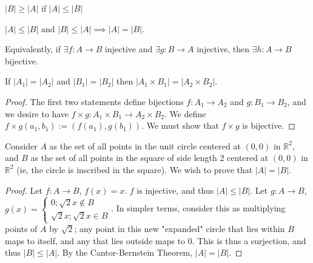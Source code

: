 \documentclass[12pt,oneside]{article}
\begin{document}
\begin{proposition}
  $|B|\geq |A|$ if $|A|\leq |B|$
\end{proposition}

\begin{theorem}
  $|A| \leq |B| \text{ and } |B| \leq |A| \implies |A| = |B|$.
  \footnotemark

  Equivalently, if $\exists f: A \to B$ injective and $\exists g: B \to A$ injective, then $\exists h: A \to B$ bijective.
\end{theorem}

\begin{proposition}
  If $|A_1|=|A_2|$ and $|B_1|=|B_2|$ then $|A_1 \times B_1| = |A_2 \times B_2|$.
\end{proposition}
\begin{proof}[Proof]
  The first two statements define bijections $f: A_1 \to A_2$ and $g: B_1 \to B_2$, and we desire to have $f \times g:  A_1 \times B_1 \to A_2 \times B_2$. We define $f\times g(a_1, b_1) := (f(a_1), g(b_1))$. We must show that $f \times g$ is bijective.
\end{proof}

\begin{example}
  Consider $A$ as the set of all points in the unit circle centered at $(0,0)$ in $\mathbb{R}^2$, and $B$ as the set of all points in the square of side length 2 centered at $(0,0)$ in $\mathbb{R}^2$ (ie, the circle is inscribed in the square). We wish to prove that $|A|=|B|$.
  \begin{proof}[Proof]
    Let $f: A \to B$, $f(x) = x$. $f$ is injective, and thus $|A|\leq|B|$. 
    Let $g: A \to B$, $g(x) = \begin{cases}
      0; \sqrt{2}x \notin B\\
      \sqrt{2}x; \sqrt{2}x \in B
    \end{cases}$. In simpler terms, consider this as multiplying points of $A$ by $\sqrt{2}$; any point in this new "expanded" circle that lies within $B$ maps to itself, and any that lies outside maps to 0. This is thus a surjection, and thus $|B| \leq |A|$. By the Cantor-Bernstein Theorem, $|A|=|B|$.
  \end{proof}
\end{example}
\end{document}
